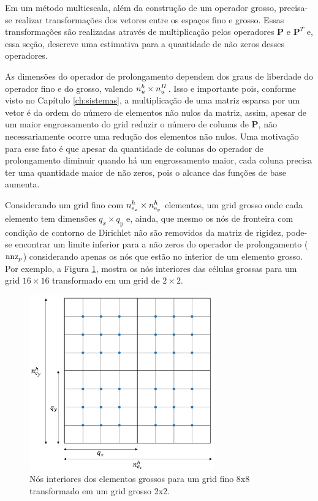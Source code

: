 Em um método multiescala, além da construção de um operador grosso, precisa-se realizar transformações dos vetores entre os espaços fino e grosso. Essas transformações são realizadas através de multiplicação pelos operadores $\mathbf{P}$ e $\mathbf{P}^T$ e, essa seção, descreve uma estimativa para a quantidade de não zeros desses operadores.

As dimensões do operador de prolongamento dependem dos graus de liberdade do operador fino e do  grosso, valendo $n_u^h \times n_u^H$. Isso e importante pois, conforme visto no Capítulo \ref{ch:sistemas}, a multiplicação de uma matriz esparsa por um vetor é da ordem do número de elementos  não nulos da matriz, assim, apesar de um maior engrossamento do grid reduzir o número de colunas de $\mathbf{P}$, não necessariamente ocorre uma redução dos elementos não nulos. Uma motivação para esse fato é que apesar da quantidade de colunas do operador de prolongamento diminuir quando há um engrossamento maior, cada coluna precisa ter uma quantidade maior de não zeros, pois o alcance das funções de base aumenta.

Considerando um grid fino com $n_{\text{e}_x}^h \times n_{\text{e}_y}^h$ elementos, um grid grosso onde cada elemento tem dimensões $q_x \times q_y$ e, ainda, que mesmo os nós de fronteira com condição de contorno de Dirichlet não são removidos da matriz de rigidez, pode-se encontrar um limite inferior para a não zeros do operador de prolongamento ($\text{nnz}_p$) considerando apenas os nós que estão no interior de um elemento grosso. Por exemplo, a Figura \ref{fig:nosinteriores}, mostra os nós interiores das células grossas para um grid $16\times16$ transformado em um grid de $2\times2$. 

\begin{figure}[!htbp]
\centering
\includegraphics[width=8cm]{chap06/figs/nosinteriores.png}
\caption{Nós interiores dos elementos grossos para um grid fino 8x8 transformado em um grid grosso 2x2.}
\label{fig:nosinteriores}
\end{figure}

